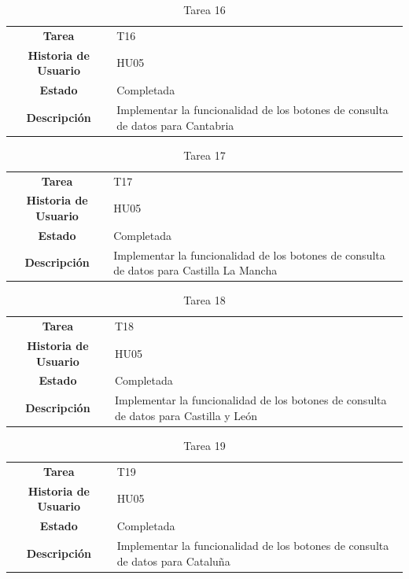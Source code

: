 \begin{table}[H]
	\begin{center}
		\begin{tabular}{| c | p{9cm} |}
			\hline
			
			\textbf{Tarea} & T16 \\
			\textbf{Historia de Usuario} & HU05 \\
			\textbf{Estado} & Completada \\
			\textbf{Descripción} & Implementar la funcionalidad de los botones de consulta de datos para Cantabria \\ \hline
		\end{tabular}
		\caption{Tarea 16}
	\end{center}
\end{table}

\begin{table}[H]
	\begin{center}
		\begin{tabular}{| c | p{9cm} |}
			\hline
			
			\textbf{Tarea} & T17 \\
			\textbf{Historia de Usuario} & HU05 \\
			\textbf{Estado} & Completada \\
			\textbf{Descripción} & Implementar la funcionalidad de los botones de consulta de datos para Castilla La Mancha \\ \hline
		\end{tabular}
		\caption{Tarea 17}
	\end{center}
\end{table}

\begin{table}[H]
	\begin{center}
		\begin{tabular}{| c | p{9cm} |}
			\hline
			
			\textbf{Tarea} & T18 \\
			\textbf{Historia de Usuario} & HU05 \\
			\textbf{Estado} & Completada \\
			\textbf{Descripción} & Implementar la funcionalidad de los botones de consulta de datos para Castilla y León \\ \hline
		\end{tabular}
		\caption{Tarea 18}
	\end{center}
\end{table}

\begin{table}[H]
	\begin{center}
		\begin{tabular}{| c | p{9cm} |}
			\hline
			
			\textbf{Tarea} & T19 \\
			\textbf{Historia de Usuario} & HU05 \\
			\textbf{Estado} & Completada \\
			\textbf{Descripción} & Implementar la funcionalidad de los botones de consulta de datos para Cataluña \\ \hline
		\end{tabular}
		\caption{Tarea 19}
	\end{center}
\end{table}

